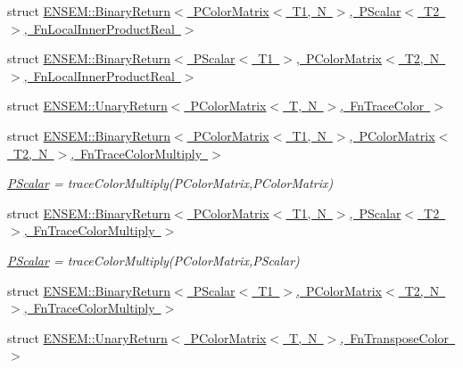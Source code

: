\begin{DoxyCompactItemize}
\item 
struct \mbox{\hyperlink{structENSEM_1_1BinaryReturn_3_01PColorMatrix_3_01T1_00_01N_01_4_00_01PScalar_3_01T2_01_4_00_01FnLocalInnerProductReal_01_4}{E\+N\+S\+E\+M\+::\+Binary\+Return$<$ P\+Color\+Matrix$<$ T1, N $>$, P\+Scalar$<$ T2 $>$, Fn\+Local\+Inner\+Product\+Real $>$}}
\item 
struct \mbox{\hyperlink{structENSEM_1_1BinaryReturn_3_01PScalar_3_01T1_01_4_00_01PColorMatrix_3_01T2_00_01N_01_4_00_01FnLocalInnerProductReal_01_4}{E\+N\+S\+E\+M\+::\+Binary\+Return$<$ P\+Scalar$<$ T1 $>$, P\+Color\+Matrix$<$ T2, N $>$, Fn\+Local\+Inner\+Product\+Real $>$}}
\item 
struct \mbox{\hyperlink{structENSEM_1_1UnaryReturn_3_01PColorMatrix_3_01T_00_01N_01_4_00_01FnTraceColor_01_4}{E\+N\+S\+E\+M\+::\+Unary\+Return$<$ P\+Color\+Matrix$<$ T, N $>$, Fn\+Trace\+Color $>$}}
\item 
struct \mbox{\hyperlink{structENSEM_1_1BinaryReturn_3_01PColorMatrix_3_01T1_00_01N_01_4_00_01PColorMatrix_3_01T2_00_01N_a47a4c46ca38f78d2b12e618a0cca27a}{E\+N\+S\+E\+M\+::\+Binary\+Return$<$ P\+Color\+Matrix$<$ T1, N $>$, P\+Color\+Matrix$<$ T2, N $>$, Fn\+Trace\+Color\+Multiply $>$}}
\begin{DoxyCompactList}\small\item\em \mbox{\hyperlink{classENSEM_1_1PScalar}{P\+Scalar}} = trace\+Color\+Multiply(\+P\+Color\+Matrix,\+P\+Color\+Matrix) \end{DoxyCompactList}\item 
struct \mbox{\hyperlink{structENSEM_1_1BinaryReturn_3_01PColorMatrix_3_01T1_00_01N_01_4_00_01PScalar_3_01T2_01_4_00_01FnTraceColorMultiply_01_4}{E\+N\+S\+E\+M\+::\+Binary\+Return$<$ P\+Color\+Matrix$<$ T1, N $>$, P\+Scalar$<$ T2 $>$, Fn\+Trace\+Color\+Multiply $>$}}
\begin{DoxyCompactList}\small\item\em \mbox{\hyperlink{classENSEM_1_1PScalar}{P\+Scalar}} = trace\+Color\+Multiply(\+P\+Color\+Matrix,\+P\+Scalar) \end{DoxyCompactList}\item 
struct \mbox{\hyperlink{structENSEM_1_1BinaryReturn_3_01PScalar_3_01T1_01_4_00_01PColorMatrix_3_01T2_00_01N_01_4_00_01FnTraceColorMultiply_01_4}{E\+N\+S\+E\+M\+::\+Binary\+Return$<$ P\+Scalar$<$ T1 $>$, P\+Color\+Matrix$<$ T2, N $>$, Fn\+Trace\+Color\+Multiply $>$}}
\item 
struct \mbox{\hyperlink{structENSEM_1_1UnaryReturn_3_01PColorMatrix_3_01T_00_01N_01_4_00_01FnTransposeColor_01_4}{E\+N\+S\+E\+M\+::\+Unary\+Return$<$ P\+Color\+Matrix$<$ T, N $>$, Fn\+Transpose\+Color $>$}}

\end{DoxyCompactItemize}
